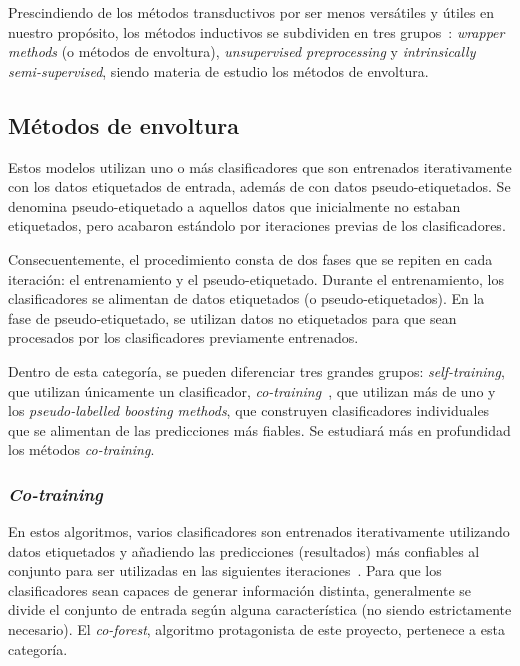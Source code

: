 Prescindiendo de los métodos transductivos por ser menos versátiles y útiles en nuestro propósito, los métodos inductivos se subdividen en tres grupos~\cite{engelen2020surveyOnSemiSupervised}: \textit{wrapper methods} (o métodos de envoltura), \textit{unsupervised preprocessing} y \textit{intrinsically semi-supervised}, siendo materia de estudio los métodos de envoltura. 


\subsection{Métodos de envoltura}

Estos modelos utilizan uno o más clasificadores que son entrenados iterativamente con los datos etiquetados de entrada, además de con datos pseudo-etiquetados. Se denomina pseudo-etiquetado a aquellos datos que inicialmente no estaban etiquetados, pero acabaron estándolo por iteraciones previas de los clasificadores.

Consecuentemente, el procedimiento consta de dos fases que se repiten en cada iteración: el entrenamiento y el pseudo-etiquetado. Durante el entrenamiento, los clasificadores se alimentan de datos etiquetados (o pseudo-etiquetados). En la fase de pseudo-etiquetado, se utilizan datos no etiquetados para que sean procesados por los clasificadores previamente entrenados. 

Dentro de esta categoría, se pueden diferenciar tres grandes grupos: \textit{self-training}, que utilizan únicamente un clasificador, \textit{co-training}~\cite{engelen2020surveyOnSemiSupervised}, que utilizan más de uno y los \textit{pseudo-labelled boosting methods}, que construyen clasificadores individuales que se alimentan de las predicciones más fiables. Se estudiará más en profundidad los métodos \textit{co-training}.

\subsubsection{\textit{Co-training}}

En estos algoritmos, varios clasificadores son entrenados iterativamente utilizando datos etiquetados y añadiendo las predicciones (resultados) más confiables al conjunto para ser utilizadas en las siguientes iteraciones~\cite{engelen2020surveyOnSemiSupervised}. Para que los clasificadores sean capaces de generar información distinta, generalmente se divide el conjunto de entrada según alguna característica (no siendo estrictamente necesario). El \textit{co-forest}, algoritmo protagonista de este proyecto, pertenece a esta categoría.

